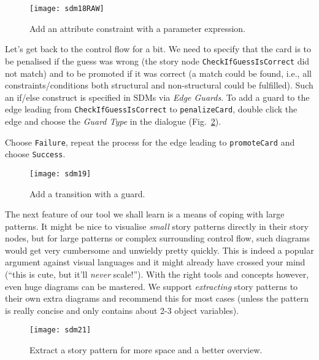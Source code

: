 \begin{figure}[htbp]
\begin{center}
  \texttt{[image: sdm18RAW]}
  \caption{Add an attribute constraint with a parameter expression.}
  \label{fig:sdm_check_att_constraint}
\end{center}
\end{figure}

Let's get back to the control flow for a bit.  We need to specify that the card is to be penalised if the guess was wrong (the story node
\texttt{Check\-If\-Guess\-Is\-Correct} did not match) and to be promoted if it was correct (a match could be found, i.e., all constraints/conditions both
 structural and non-structural could be fulfilled). Such an if/else construct is specified in SDMs via \emph{Edge Guards}. To add a guard to
the edge leading from \texttt{Check\-If\-Guess\-Is\-Correct} to \texttt{penalize\-Card}, double click the edge and choose the \emph{Guard Type}
in the dialogue (Fig.~\ref{fig:sdm_check_guard}).

Choose \texttt{Failure}, repeat the process for the edge leading to \texttt{promoteCard} and choose \texttt{Success}.

\begin{figure}[htbp]
\begin{center}
  \texttt{[image: sdm19]}
  \caption{Add a transition with a guard.}
  \label{fig:sdm_check_guard}
\end{center}
\end{figure}


The next feature of our tool we shall learn is a means of coping with large patterns. It might be nice to visualise \emph{small} story patterns directly in
their story nodes, but for large patterns or complex surrounding control flow, such diagrams would get very cumbersome and unwieldy pretty quickly.  This is
indeed a popular argument against visual languages and it might already have crossed your mind (``this is cute, but it'll \emph{never} scale!''). With the right
tools and concepts however, even huge diagrams can be mastered. We support \emph{extracting} story patterns to their own extra
diagrams and recommend this for most cases (unless the pattern is really concise and only contains about 2-3 object variables).

\begin{figure}[htbp]
\begin{center}
  \texttt{[image: sdm21]}
  \caption{Extract a story pattern for more space and a better overview.}
  \label{fig:sdm_check_extract_storypattern}
\end{center}
\end{figure}

